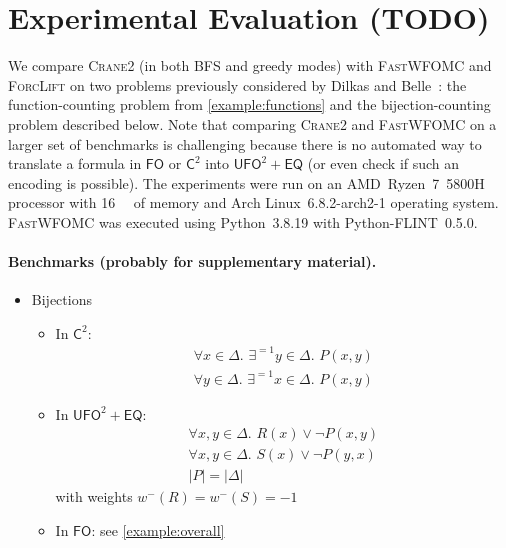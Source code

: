 \documentclass{article}
\theoremstyle{definition}
\newcommand{\Ctwo}{$\mathsf{C}^{2}$}
\newcommand{\FO}{$\mathsf{FO}$}
\newcommand{\UFO}{$\mathsf{UFO}^{2} + \mathsf{EQ}$}
\newcommand{\Cranetwo}{\textsc{Crane2}}
\begin{document}
\section{Experimental Evaluation (TODO)}

We compare \Cranetwo{} (in both BFS and greedy modes) with \textsc{FastWFOMC}
and \textsc{ForcLift} on two problems previously considered by Dilkas and
Belle~: the function-counting problem from
\cref{example:functions} and the bijection-counting problem described below.
Note that comparing \Cranetwo{} and \textsc{FastWFOMC} on a larger set of
benchmarks is challenging because there is no automated way to translate a
formula in \FO{} or \Ctwo{} into \UFO{} (or even check if such an encoding is
possible). The experiments were run on an AMD~Ryzen~7~5800H processor with
\SI{16}{\gibi\byte} of memory and Arch Linux~6.8.2-arch2-1 operating system.
\textsc{FastWFOMC} was executed using Python~3.8.19 with Python-FLINT~0.5.0.

\paragraph{Benchmarks (probably for supplementary material).}
\begin{itemize}
  \item Bijections
        \begin{itemize}
          \item In \Ctwo:
                \begin{gather*}
                  \forall x \in \Delta\text{. }\exists^{=1} y \in \Delta\text{. }P(x, y)\\
                  \forall y \in \Delta\text{. }\exists^{=1} x \in \Delta\text{. }P(x, y)
                \end{gather*}
          \item In \UFO:
                \begin{gather*}
                  \forall x, y \in \Delta\text{. }R(x) \lor \neg P(x, y)\\
                  \forall x, y \in \Delta\text{. }S(x) \lor \neg P(y, x)\\
                  |P| = |\Delta|
                \end{gather*}
                with weights $w^{-}(R) = w^{-}(S) = -1$
          \item In \FO: see \cref{example:overall}
        \end{itemize}
\end{itemize}
\end{document}

